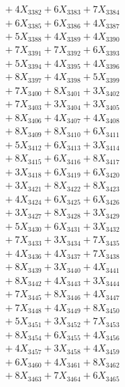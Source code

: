 \documentclass[a4paper,10pt]{article}
\begin{document}
{\begin{align}
&\;  + 4 X_{3382} + 6 X_{3383} + 7 X_{3384} \\[0.3ex]
&\;  + 6 X_{3385} + 6 X_{3386} + 4 X_{3387} \\[0.3ex]
&\;  + 5 X_{3388} + 4 X_{3389} + 4 X_{3390} \\[0.3ex]
&\;  + 7 X_{3391} + 7 X_{3392} + 6 X_{3393} \\[0.3ex]
&\;  + 5 X_{3394} + 4 X_{3395} + 4 X_{3396} \\[0.3ex]
&\;  + 8 X_{3397} + 4 X_{3398} + 5 X_{3399} \\[0.5ex]\allowbreak
&\;  + 7 X_{3400} + 8 X_{3401} + 3 X_{3402} \\[0.3ex]
&\;  + 7 X_{3403} + 3 X_{3404} + 3 X_{3405} \\[0.3ex]
&\;  + 8 X_{3406} + 4 X_{3407} + 4 X_{3408} \\[0.3ex]
&\;  + 8 X_{3409} + 8 X_{3410} + 6 X_{3411} \\[0.3ex]
&\;  + 5 X_{3412} + 6 X_{3413} + 3 X_{3414} \\[0.3ex]
&\;  + 8 X_{3415} + 6 X_{3416} + 8 X_{3417} \\[0.3ex]
&\;  + 3 X_{3418} + 6 X_{3419} + 6 X_{3420} \\[0.3ex]
&\;  + 3 X_{3421} + 8 X_{3422} + 8 X_{3423} \\[0.3ex]
&\;  + 4 X_{3424} + 6 X_{3425} + 6 X_{3426} \\[0.3ex]
&\;  + 3 X_{3427} + 8 X_{3428} + 3 X_{3429} \\[0.5ex]\allowbreak
&\;  + 5 X_{3430} + 6 X_{3431} + 3 X_{3432} \\[0.3ex]
&\;  + 7 X_{3433} + 3 X_{3434} + 7 X_{3435} \\[0.3ex]
&\;  + 4 X_{3436} + 4 X_{3437} + 7 X_{3438} \\[0.3ex]
&\;  + 8 X_{3439} + 3 X_{3440} + 4 X_{3441} \\[0.3ex]
&\;  + 8 X_{3442} + 4 X_{3443} + 3 X_{3444} \\[0.3ex]
&\;  + 7 X_{3445} + 8 X_{3446} + 4 X_{3447} \\[0.3ex]
&\;  + 7 X_{3448} + 4 X_{3449} + 8 X_{3450} \\[0.3ex]
&\;  + 5 X_{3451} + 3 X_{3452} + 7 X_{3453} \\[0.3ex]
&\;  + 8 X_{3454} + 6 X_{3455} + 4 X_{3456} \\[0.3ex]
&\;  + 4 X_{3457} + 3 X_{3458} + 4 X_{3459} \\[0.5ex]\allowbreak
&\;  + 6 X_{3460} + 4 X_{3461} + 8 X_{3462} \\[0.3ex]
&\;  + 8 X_{3463} + 7 X_{3464} + 6 X_{3465} \\[0.3ex]

\end{align}}
\end{document}
